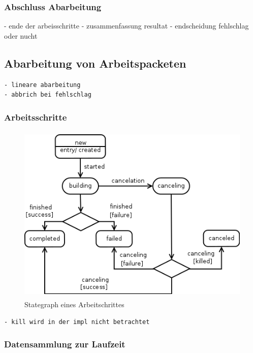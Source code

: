 \subsubsection{Abschluss Abarbeitung}

- ende der arbeisschritte
- zusammenfassung resultat
- endscheidung fehlschlag oder nucht


\subsection{Abarbeitung von Arbeitspacketen}

\begin{verbatim}
- lineare abarbeitung
- abbrich bei fehlschlag
\end{verbatim}

\subsubsection{Arbeitsschritte}


\begin{figure}[ht] 
  \centering
  \label{fig:lebenszyklus-arbeitsschritt}
  \includegraphics[height=3.4in]{imageinput/lebenszyklus-arbeitsschritt.png}
  \caption{Stategraph eines Arbeitschrittes}
\end{figure}

\begin{verbatim}
- kill wird in der impl nicht betrachtet

\end{verbatim}


\subsubsection{Datensammlung zur Laufzeit}

